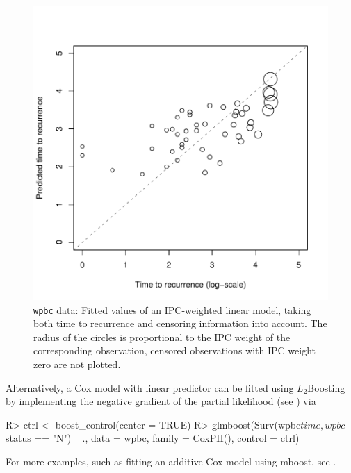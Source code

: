 \documentclass{article}
\newcommand{\Rpackage}[1]{{\normalfont\fontseries{b}\selectfont #1}}
\newcommand{\Robject}[1]{\texttt{#1}}
\newenvironment{Schunk}{}{}
\begin{document}
\begin{figure}[t]
\begin{center}
\includegraphics{figures/BH-wpbc-glmboost-censored-fit}
\caption{\Robject{wpbc} data: Fitted values of an IPC-weighted linear
  model, taking both time to recurrence and 
    censoring information into account. The radius of the circles is proportional to the
    IPC weight of the corresponding observation, censored observations with IPC weight zero
    are not plotted. \label{wpbc-glmboost-censored-fit}}
\end{center}
\end{figure}

Alternatively, a Cox model with linear predictor can be fitted using
$L_2$Boosting by 
implementing the negative gradient  
of the partial likelihood (see \cite{ridgew99}) via
\begin{Schunk}
\begin{Sinput}
R> ctrl <- boost_control(center = TRUE)
R> glmboost(Surv(wpbc$time, wpbc$status == "N") ~ ., 
         data = wpbc, family = CoxPH(), control = ctrl)
\end{Sinput}
\end{Schunk}
For more examples, such as fitting an additive Cox model using
\Rpackage{mboost}, see \citep{Hothorn:2006:Bioinformatics:16940323}.  

\clearpage



\end{document}
